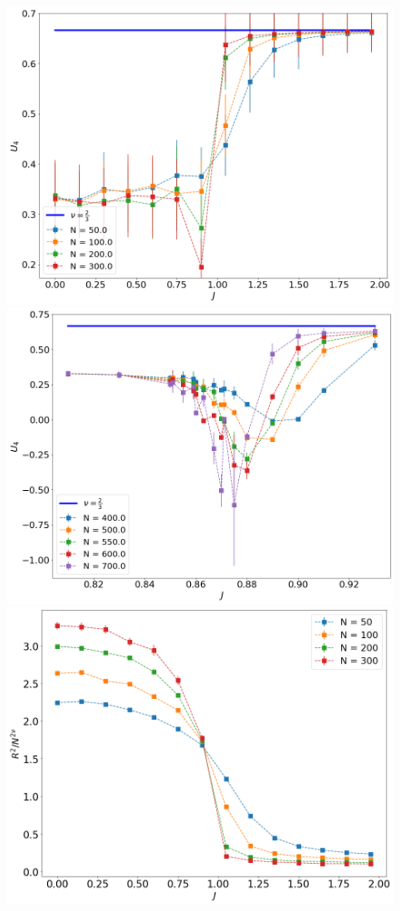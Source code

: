  \begin{figure}
	\centering
	\includegraphics[scale=0.23]{Images/3_bindercumulants_shortchains.png} 	\includegraphics[scale=0.23]{Images/3_bindercumulants_longchains.png} \\ 
	\includegraphics[scale=0.23]{Images/3_rscaling_shortchains.png}

\end{figure}
